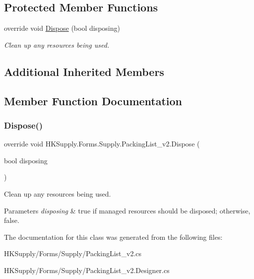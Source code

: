 \subsection*{Protected Member Functions}
\begin{DoxyCompactItemize}
\item 
override void \mbox{\hyperlink{class_h_k_supply_1_1_forms_1_1_supply_1_1_packing_list__v2_a79693fbee29743cdd6073ecdfdf27ce4}{Dispose}} (bool disposing)
\begin{DoxyCompactList}\small\item\em Clean up any resources being used. \end{DoxyCompactList}\end{DoxyCompactItemize}
\subsection*{Additional Inherited Members}


\subsection{Member Function Documentation}
\mbox{\label{class_h_k_supply_1_1_forms_1_1_supply_1_1_packing_list__v2_a79693fbee29743cdd6073ecdfdf27ce4}} 
\subsubsection{\texorpdfstring{Dispose()}{Dispose()}}
{\footnotesize\ttfamily override void H\+K\+Supply.\+Forms.\+Supply.\+Packing\+List\+\_\+v2.\+Dispose (\begin{DoxyParamCaption}\item[{bool}]{disposing }\end{DoxyParamCaption})\hspace{0.3cm}{\ttfamily [protected]}}



Clean up any resources being used. 


\begin{DoxyParams}{Parameters}
{\em disposing} & true if managed resources should be disposed; otherwise, false.\\
\hline
\end{DoxyParams}


The documentation for this class was generated from the following files\+:\begin{DoxyCompactItemize}
\item 
H\+K\+Supply/\+Forms/\+Supply/Packing\+List\+\_\+v2.\+cs\item 
H\+K\+Supply/\+Forms/\+Supply/Packing\+List\+\_\+v2.\+Designer.\+cs\end{DoxyCompactItemize}
